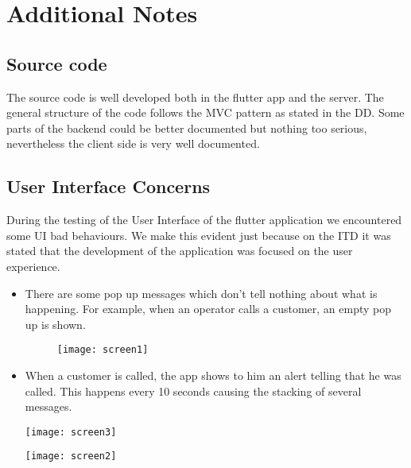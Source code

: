 \chapter{Additional Notes}
\section{Source code}
The source code is well developed both in the flutter app and the server. The general structure of the code follows the MVC pattern as stated in the DD.\newline
Some parts of the backend could be better documented but nothing too serious, nevertheless the client side is very well documented.

\section{User Interface Concerns}
During the testing of the User Interface of the flutter application we encountered some UI bad behaviours.\newline
We make this evident just because on the ITD it was stated that the development of the application was focused on the user experience.

\begin{itemize}
	\item There are some pop up messages which don't tell nothing about what is happening. For example, when an operator calls a customer, an empty pop up is shown.
	\vspace{0.5cm}
	\begin{figure}[H]
		\centering
		\texttt{[image: screen1]}
	\end{figure}
	\clearpage
	\item When a customer is called, the app shows to him an alert telling that he was called. This happens every 10 seconds causing the stacking of several messages.
	
	\vspace{0.5cm}
	\begin{minipage}{.5\textwidth}
		\centering
		\texttt{[image: screen3]}
		\captionsetup{type=figure}
	\end{minipage}%
	\begin{minipage}{.5\textwidth}
		\centering
		\texttt{[image: screen2]}
		\captionsetup{type=figure}
	\end{minipage}
\end{itemize}